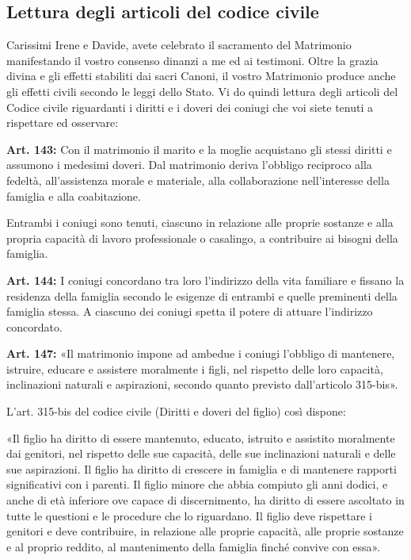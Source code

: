 \subsection*{Lettura degli articoli del codice civile}
 
	\begin{dialoghi}
		\item[\sacerdote] Carissimi Irene e Davide, avete celebrato il sacramento del Matrimonio manifestando il vostro consenso dinanzi a me ed ai testimoni. Oltre la grazia divina e gli effetti stabiliti dai sacri Canoni, il vostro Matrimonio produce anche gli effetti civili secondo le leggi dello Stato. Vi do quindi lettura degli articoli del Codice civile riguardanti i diritti e i doveri dei coniugi che voi siete tenuti a rispettare ed osservare:

		\textbf{Art. 143:} Con il matrimonio il marito e la moglie acquistano gli stessi diritti e assumono i medesimi doveri. Dal matrimonio deriva l'obbligo reciproco alla fedeltà, all'assistenza morale e materiale, alla collaborazione nell'interesse della famiglia e alla coabitazione.

		Entrambi i coniugi sono tenuti, ciascuno in relazione alle proprie sostanze e alla propria capacità di lavoro professionale o casalingo, a contribuire ai bisogni della famiglia.

		\textbf{Art. 144:} I coniugi concordano tra loro l'indirizzo della vita familiare e fissano la residenza della famiglia secondo le esigenze di entrambi e quelle preminenti della famiglia stessa. A ciascuno dei coniugi spetta il potere di attuare l'indirizzo concordato.

		\textbf{Art. 147:} «Il matrimonio impone ad ambedue i coniugi l'obbligo di mantenere, istruire, educare e assistere moralmente i figli, nel rispetto delle loro capacità, inclinazioni naturali e aspirazioni, secondo quanto previsto dall'articolo 315-bis».

		L'art. 315-bis del codice civile (Diritti e doveri del figlio) così dispone:

		«Il figlio ha diritto di essere mantenuto, educato, istruito e assistito moralmente dai genitori, nel rispetto delle sue capacità, delle sue inclinazioni naturali e delle sue aspirazioni. Il figlio ha diritto di crescere in famiglia e di mantenere rapporti significativi con i parenti. Il figlio minore che abbia compiuto gli anni dodici, e anche di età inferiore ove capace di discernimento, ha diritto di essere ascoltato in tutte le questioni e le procedure che lo riguardano. Il figlio deve rispettare i genitori e deve contribuire, in relazione alle proprie capacità, alle proprie sostanze e al proprio reddito, al mantenimento della famiglia finché convive con essa».
	\end{dialoghi}


